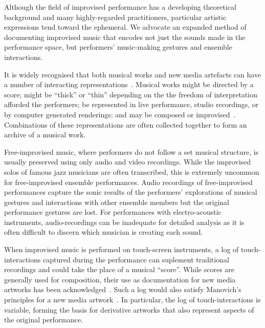 \documentclass[graybox]{svmult}
\begin{document}
Although the field of improvised performance has a developing
theoretical background and many highly-regarded practitioners,
particular artistic expressions tend toward the ephemeral. We advocate
an expanded method of documenting improvised music that encodes not
just the sounds made in the performance space, but performers'
music-making gestures and ensemble interactions.

It is widely recognised that both musical works and new media
artefacts can have a number of interacting
representations~\cite{Rinehart:2007pi}. Musical works might be
directed by a score; might be ``thick'' or ``thin'' depending on the
the freedom of interpretation afforded the performers; be represented
in live performance, studio recordings, or by computer generated
renderings; and may be composed or improvised~\cite{Davies:2005fj}.
Combinations of these representations are often collected together to
form an archive of a musical work.

Free-improvised music, where performers do not follow a set musical
structure, is usually preserved using only audio and video recordings.
While the improvised solos of famous jazz musicians are often
transcribed, this is extremely uncommon for free-improvised ensemble
performances. Audio recordings of free-improvised performances capture
the sonic results of the performers' explorations of musical gestures
and interactions with other ensemble members but the original
performance gestures are lost. For performances with electro-acoustic
instruments, audio-recordings can be inadequate for detailed analysis
as it is often difficult to discern which musician is creating each
sound.

When improvised music is performed on touch-screen instruments, a log
of touch-interactions captured during the performance can suplement
traditional recordings and could take the place of a musical
``score''. While scores are generally used for composition, their use
as documentation for new media artworks has been
acknowledged~\cite{MacDonald:2009ve}. Such a log would also satisfy
Manovich's principles for a new media artwork~\cite{Manovich:2002ly}.
In particular, the log of touch-interactions is variable, forming the
basis for derivative artworks that also represent aspects of the
original performance.
\end{document}
